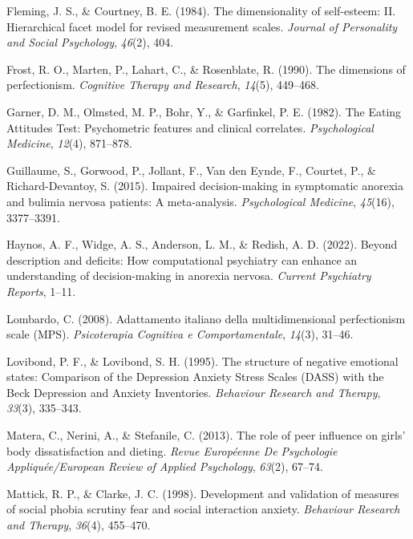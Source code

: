 \documentclass[
  man,floatsintext]{apa6}
\newlength{\cslhangindent}
\newlength{\cslentryspacingunit} %
\newenvironment{CSLReferences}[2] %
 {%
  \setlength{\parindent}{0pt}
  \ifodd #1
  \let\oldpar\par
  \def\par{\hangindent=\cslhangindent\oldpar}
  \fi
  \setlength{\parskip}{#2\cslentryspacingunit}
 }%
 {}
\begin{document}
\begin{CSLReferences}{1}{0}
\leavevmode{}%
Fleming, J. S., \& Courtney, B. E. (1984). The dimensionality of self-esteem: II. Hierarchical facet model for revised measurement scales. \emph{Journal of Personality and Social Psychology}, \emph{46}(2), 404.

\leavevmode{}%
Frost, R. O., Marten, P., Lahart, C., \& Rosenblate, R. (1990). The dimensions of perfectionism. \emph{Cognitive Therapy and Research}, \emph{14}(5), 449--468.

\leavevmode{}%
Garner, D. M., Olmsted, M. P., Bohr, Y., \& Garfinkel, P. E. (1982). The {Eating} {Attitudes} {Test}: Psychometric features and clinical correlates. \emph{Psychological Medicine}, \emph{12}(4), 871--878.

\leavevmode{}%
Guillaume, S., Gorwood, P., Jollant, F., Van den Eynde, F., Courtet, P., \& Richard-Devantoy, S. (2015). Impaired decision-making in symptomatic anorexia and bulimia nervosa patients: A meta-analysis. \emph{Psychological Medicine}, \emph{45}(16), 3377--3391.

\leavevmode{}%
Haynos, A. F., Widge, A. S., Anderson, L. M., \& Redish, A. D. (2022). Beyond description and deficits: How computational psychiatry can enhance an understanding of decision-making in anorexia nervosa. \emph{Current Psychiatry Reports}, 1--11.

\leavevmode{}%
Lombardo, C. (2008). Adattamento italiano della multidimensional perfectionism scale (MPS). \emph{Psicoterapia Cognitiva e Comportamentale}, \emph{14}(3), 31--46.

\leavevmode{}%
Lovibond, P. F., \& Lovibond, S. H. (1995). {The structure of negative emotional states: Comparison of the Depression Anxiety Stress Scales (DASS) with the Beck Depression and Anxiety Inventories}. \emph{Behaviour Research and Therapy}, \emph{33}(3), 335--343.

\leavevmode{}%
Matera, C., Nerini, A., \& Stefanile, C. (2013). The role of peer influence on girls' body dissatisfaction and dieting. \emph{Revue Europ{é}enne De Psychologie Appliqu{é}e/European Review of Applied Psychology}, \emph{63}(2), 67--74.

\leavevmode{}%
Mattick, R. P., \& Clarke, J. C. (1998). Development and validation of measures of social phobia scrutiny fear and social interaction anxiety. \emph{Behaviour Research and Therapy}, \emph{36}(4), 455--470.


\end{CSLReferences}
\end{document}
